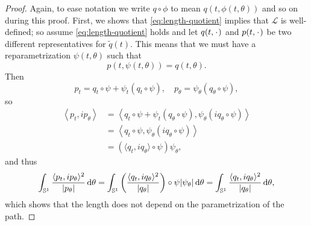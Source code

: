 \begin{proof}
  Again, to ease notation we write $q \circ \phi$ to mean $q(t, \phi(t,\theta))$ and so on during this proof.
  First, we shows that \eqref{eq:length-quotient} implies that $\mathcal{L}$ is well-defined; so assume \eqref{eq:length-quotient} holds and let $q(t,\blank)$ and $p(t, \blank)$ be two different representatives for $\tilde{q}(t)$. This means that we must have a reparametrization $\psi(t,\theta)$ such that
  \begin{equation*}
    p(t, \psi(t,\theta)) = q(t, \theta).
  \end{equation*}
  Then
  \begin{equation*}
    p_t = q_t\circ \psi + \psi_t (q_t \circ \psi), \quad
    p_{\theta} = \psi_{\theta}(q_{\theta} \circ \psi),
  \end{equation*}
  so
  \begin{equation*}
    \begin{aligned}
      \left\langle
        p_t, i p_{\theta}
      \right\rangle
     &  =     \left\langle
        q_t \circ \psi + \psi_t (q_{\theta} \circ \psi),
        \psi_{\theta} (iq_{\theta} \circ \psi)
      \right\rangle \\
     & =     \left\langle
        q_t \circ \psi,
        \psi_{\theta} (iq_{\theta} \circ \psi)
      \right\rangle \\
      & = (\langle q_t, i q_{\theta}\rangle \circ\psi) \psi_{\theta},
    \end{aligned}
  \end{equation*}
  and thus
  \begin{equation*}
    \int_{\mathbb{S}^1} \frac{\langle p_t, i p_{\theta}\rangle^2}{|p_{\theta}|} \mathop{}\!\mathrm{d} \theta
    =
    \int_{\mathbb{S}^1}
    \left(
      \frac{\langle q_t, i q_{\theta}\rangle^2}{|q_{\theta}|}
    \right) \circ \psi |\psi_{\theta}| \mathop{}\!\mathrm{d} \theta
    =    \int_{\mathbb{S}^1}
      \frac{\langle q_t, i q_{\theta}\rangle^2}{|q_{\theta}|}  \mathop{}\!\mathrm{d} \theta,
    \end{equation*}
    which shows that the length does not depend on the parametrization of the path.


\end{proof}
